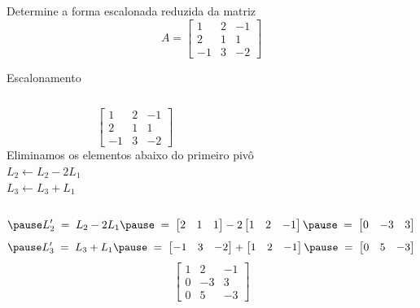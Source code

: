 \begin{question}
Determine a forma escalonada reduzida da matriz
\[
  A=
  \begin{bmatrix}
    1  & 2 & -1 \\
    2  & 1 & 1  \\
    -1 & 3 & -2
  \end{bmatrix}
\]
\end{question}

\begin{resolution}{Escalonamento}
\begin{columns}
  \[\;\;\;
  \begin{bmatrix}
    1  & 2 & -1 \\
    2  & 1 & 1  \\
    -1 & 3 & -2
  \end{bmatrix}
  \]
  \pause
{}
  Eliminamos os elementos abaixo do primeiro pivô
  \\ \pause
  \(
    L_2 \leftarrow L_2 -2 L_1
  \)
  \\ \pause
  \(
    L_3 \leftarrow L_3 + L_1
  \)
\end{columns}
\vspace{-\baselineskip}
\[
  \pause
  L'_2
  \;=\;
  L_2 -2 L_1
  \pause
  \;=\;
  \begin{bmatrix}
    2  & 1 & 1
  \end{bmatrix}
  -2
  \begin{bmatrix}
    1  & 2 & -1
  \end{bmatrix}
  \pause
  \;=\;
  \begin{bmatrix}
    0 & -3 & 3
  \end{bmatrix}
\]
\[
  \pause
  L'_3
  \;=\;
  L_3 + L_1
  \pause
  \;=\;
  \begin{bmatrix}
    -1 & 3 & -2
  \end{bmatrix}
  +
  \begin{bmatrix}
    1  & 2 & -1
  \end{bmatrix}
  \pause
  \;=\;
  \begin{bmatrix}
    0 & 5  & -3
  \end{bmatrix}
\]
\pause
\[
  \begin{bmatrix}
    1 & 2  & -1 \\
    0 & -3 & 3  \\
    0 & 5  & -3
  \end{bmatrix}
\]
\end{resolution}

